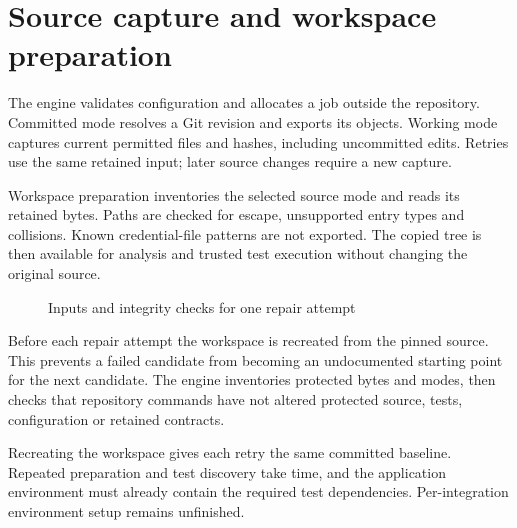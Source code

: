 \documentclass[12pt,a4paper,oneside]{report}
\begin{document}
\section{Source capture and workspace preparation}

The engine validates configuration and allocates a job outside the repository. Committed mode resolves a Git revision and exports its objects. Working mode captures current permitted files and hashes, including uncommitted edits. Retries use the same retained input; later source changes require a new capture.

Workspace preparation inventories the selected source mode and reads its retained bytes. Paths are checked for escape, unsupported entry types and collisions. Known credential-file patterns are not exported. The copied tree is then available for analysis and trusted test execution without changing the original source.

\begin{figure}[htbp]\centering
{}
\caption{Inputs and integrity checks for one repair attempt}\label{fig:5.1}
\end{figure}

Before each repair attempt the workspace is recreated from the pinned source. This prevents a failed candidate from becoming an undocumented starting point for the next candidate. The engine inventories protected bytes and modes, then checks that repository commands have not altered protected source, tests, configuration or retained contracts.

Recreating the workspace gives each retry the same committed baseline. Repeated preparation and test discovery take time, and the application environment must already contain the required test dependencies. Per-integration environment setup remains unfinished.
\end{document}
